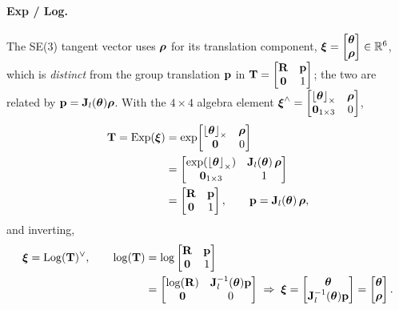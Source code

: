 \paragraph{Exp / Log.} The SE(3) tangent vector uses $\vect{\rho}$ for its translation component, $\vect{\xi} = \begin{bmatrix}\vect{\theta}\\\vect{\rho}\end{bmatrix}\in\Reals^6$, which is \emph{distinct} from the group translation $\vect{p}$ in $\vect{T} = \begin{bmatrix}\vect{R} & \vect{p}\\ \vect{0} & 1\end{bmatrix}$; the two are related by $\vect{p} = \vect{J}_l(\vect{\theta})\vect{\rho}$. With the $4\times4$ algebra element $\vect{\xi}^{\wedge} = \begin{bmatrix}\skewsym{\vect{\theta}} & \vect{\rho}\\ \vect{0}_{1\times3} & 0\end{bmatrix}$,
\begin{align}
\vect{T} = \Exp(\vect{\xi}) &= \exp\!\begin{bmatrix}\skewsym{\vect{\theta}} & \vect{\rho}\\ \vect{0} & 0\end{bmatrix} \\
&= \begin{bmatrix} \exp(\skewsym{\vect{\theta}}) & \vect{J}_l(\vect{\theta})\,\vect{\rho} \\ \vect{0}_{1\times3} & 1 \end{bmatrix} \\
&= \begin{bmatrix} \vect{R} & \vect{p} \\ \vect{0} & 1 \end{bmatrix}, \qquad \vect{p} = \vect{J}_l(\vect{\theta})\,\vect{\rho},
\end{align}
and inverting,
\begin{align}
\vect{\xi} = \Log(\vect{T})^{\vee}, \qquad
\log(\vect{T}) &= \log\begin{bmatrix}\vect{R} & \vect{p}\\ \vect{0} & 1\end{bmatrix} \\
&= \begin{bmatrix}\log(\vect{R}) & \vect{J}_l^{-1}(\vect{\theta})\vect{p}\\ \vect{0} & 0\end{bmatrix}
\;\Rightarrow\;
\vect{\xi} = \begin{bmatrix}\vect{\theta}\\ \vect{J}_l^{-1}(\vect{\theta})\vect{p}\end{bmatrix} = \begin{bmatrix}\vect{\theta}\\ \vect{\rho}\end{bmatrix}.
\end{align}
